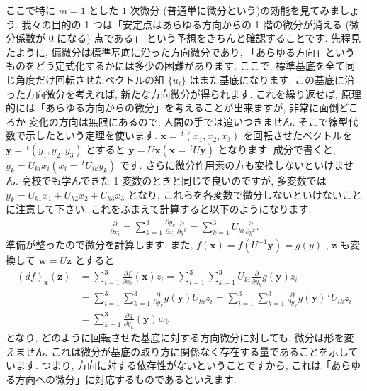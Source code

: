 \documentclass[openany, a4paper, oneside]{book}
\theoremstyle{break}
\theoremstyle{breakdefn}
\begin{document}
ここで特に $m=1$ とした $1$ 次微分 (普通単に微分という)の効能を見てみましょう.
我々の目的の 1 つは「安定点はあらゆる方向からの 1 階の微分が消える (微分係数が 0 になる) 点である」
という予想をきちんと確認することです.
先程見たように, 偏微分は標準基底に沿った方向微分であり, 「あらゆる方向」というものをどう定式化するかには多少の困難があります.
ここで, 標準基底を全て同じ角度だけ回転させたベクトルの組 $\{u_i\}$ はまた基底になります.
この基底に沿った方向微分を考えれば, 新たな方向微分が得られます.
これを繰り返せば, 原理的には「あらゆる方向からの微分」を考えることが出来ますが, 非常に面倒どころか
変化の方向は無限にあるので, 人間の手では追いつきません.
そこで線型代数で示したという定理を使います.
 $\bm{x}=\,^t (x_1,x_2,x_3)$ を回転させたベクトルを $\bm{y}=\,^t (y_1,y_2,y_3)$ とすると
 $\bm{y}=U\bm{x}(\bm{x}=\,^tU\bm{y})$ となります. 成分で書くと,  $y_k=U_{ki}x_i (x_i=\,^tU_{ik}y_k)$ です.
さらに微分作用素の方も変換しないといけません.
高校でも学んできた 1 変数のときと同じで良いのですが,
多変数では $y_k=U_{k1}x_1+U_{k2}x_2+U_{k3}x_3$ となり,
これらを各変数で微分しないといけないことに注意して下さい.
これをふまえて計算すると以下のようになります.
    \begin{align}
        \frac{\partial } {\partial x_i}
        =
        \sum_{k=1}^3 \frac{\partial y_k } {\partial x_i} \frac{\partial } {\partial y^k}
        =
        \sum_{k=1}^3 U_{ki} \frac{\partial } {\partial y^k}.
    \end{align}
準備が整ったので微分を計算します.
また,  $f (\bm{x})=f (U^{-1}\bm{y})=g (y)$ ,  $\bm{z}$ も変換して $\bm{w}=U\bm{z}$ とすると
    \begin{align}
        (df)_{\bm{x}}(\bm{z})
        &=
        \sum_{i=1}^3 \frac{\partial f } {\partial x_i }(\bm{x}) z_i
        =
        \sum_{i=1}^3 \sum_{k=1}^{3}     U_{ki} \frac{\partial } {\partial y_k}g (\bm{y}) z_i\\
        &=
        \sum_{i=1}^3 \sum_{k=1}^{3} \frac{\partial } {\partial y_k} g (\bm{y}) U_{ki} z_i
        =
        \sum_{i=1}^3 \sum_{k=1}^{3} \frac{\partial } {\partial y_k} g (\bm{y}) \,^tU_{ik} z_i\\
        &=
        \sum_{k=1}^{3} \frac{\partial g} {\partial y_k} (\bm{y}) w_k
    \end{align}
となり, どのように回転させた基底に対する方向微分に対しても, 微分は形を変えません.
これは微分が基底の取り方に関係なく存在する量であることを示しています.
つまり, 方向に対する依存性がないということですから, これは「あらゆる方向への微分」に対応するものであるといえます.
\end{document}
